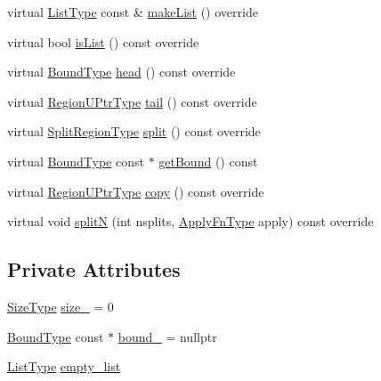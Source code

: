 \begin{DoxyCompactItemize}
\item 
virtual \hyperlink{structvt_1_1group_1_1region_1_1_region_a4e35b2fc6dca06aca0b7bc0e19b35c5a}{List\+Type} const  \& \hyperlink{structvt_1_1group_1_1region_1_1_shallow_list_aecf1849757306e2d8a3c339a4bdb6453}{make\+List} () override
\item 
virtual bool \hyperlink{structvt_1_1group_1_1region_1_1_shallow_list_a5d83012cacf2a8ebeb3edb55603fceaa}{is\+List} () const override
\item 
virtual \hyperlink{structvt_1_1group_1_1region_1_1_region_abf426ff85bed72c1c6524fad6a9f1751}{Bound\+Type} \hyperlink{structvt_1_1group_1_1region_1_1_shallow_list_a249b65b9cc1a44131cf52488baea9a41}{head} () const override
\item 
virtual \hyperlink{structvt_1_1group_1_1region_1_1_region_ae5f42cf159116a3cf8bd65423eb01037}{Region\+U\+Ptr\+Type} \hyperlink{structvt_1_1group_1_1region_1_1_shallow_list_a358a60631cc0d1dd55d72af82e287014}{tail} () const override
\item 
virtual \hyperlink{structvt_1_1group_1_1region_1_1_region_ab8d05c0978c7f38292a9ed5a15498a4b}{Split\+Region\+Type} \hyperlink{structvt_1_1group_1_1region_1_1_shallow_list_a766a07e9f1c8580a1b986a71bb80ea66}{split} () const override
\item 
virtual \hyperlink{structvt_1_1group_1_1region_1_1_region_abf426ff85bed72c1c6524fad6a9f1751}{Bound\+Type} const  $\ast$ \hyperlink{structvt_1_1group_1_1region_1_1_shallow_list_a3ca4276a7602a1ed44f02dfa7e600e88}{get\+Bound} () const
\item 
virtual \hyperlink{structvt_1_1group_1_1region_1_1_region_ae5f42cf159116a3cf8bd65423eb01037}{Region\+U\+Ptr\+Type} \hyperlink{structvt_1_1group_1_1region_1_1_shallow_list_a43434547454d02f9069873282675058f}{copy} () const override
\item 
virtual void \hyperlink{structvt_1_1group_1_1region_1_1_shallow_list_ac41946e0f130b3d4b42f9edbe20f3605}{splitN} (int nsplits, \hyperlink{structvt_1_1group_1_1region_1_1_region_a7c9e99b1157d2fe2f3e6fc36a1463a96}{Apply\+Fn\+Type} apply) const override
\end{DoxyCompactItemize}
\subsection*{Private Attributes}
\begin{DoxyCompactItemize}
\item 
\hyperlink{structvt_1_1group_1_1region_1_1_region_a9bb381adf31111aae34dbc644bad6c1f}{Size\+Type} \hyperlink{structvt_1_1group_1_1region_1_1_shallow_list_a86ed6a2eab4b32509f9eeacb315b8a68}{size\+\_\+} = 0
\item 
\hyperlink{structvt_1_1group_1_1region_1_1_region_abf426ff85bed72c1c6524fad6a9f1751}{Bound\+Type} const  $\ast$ \hyperlink{structvt_1_1group_1_1region_1_1_shallow_list_ad1567c77ff9e5cbf61264910072b087f}{bound\+\_\+} = nullptr
\item 
\hyperlink{structvt_1_1group_1_1region_1_1_region_a4e35b2fc6dca06aca0b7bc0e19b35c5a}{List\+Type} \hyperlink{structvt_1_1group_1_1region_1_1_shallow_list_a49f2adbe2bda0e5d175c77df789f96b4}{empty\+\_\+list}
\end{DoxyCompactItemize}
